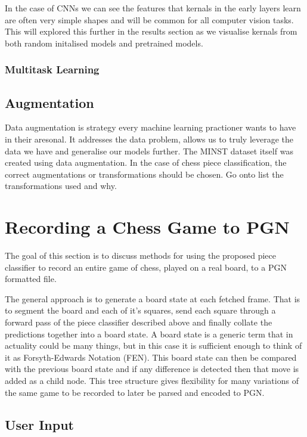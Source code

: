 In the case of CNNs we can see the features that kernals in the early layers learn \cite{} are often very simple shapes and will be common for all
computer vision tasks.  This will explored this further in the results section as we visualise kernals from both random initalised models and 
pretrained models.

\subsubsection{Multitask Learning}

\subsection{Augmentation}
Data augmentation is strategy every machine learning practioner wants to have in their aresonal.  It addresses the data problem, allows us to truly 
leverage the data we have and generalise our models further.  The MINST \cite{} dataset itself was created using data augmentation.
In the case of chess piece classification, the correct augmentations or transformations should be chosen.
Go onto list the transformations used and why.


\section{Recording a Chess Game to PGN}
The goal of this section is to discuss methods for using the proposed piece classifier to record an entire game of chess, played on a real board, 
to a PGN formatted file.

The general approach is to generate a board state at each fetched frame.  That is to segment the board and each of it's squares, send each square 
through a forward pass of the piece classifier described above and finally collate the predictions together into a board state.  A board state is 
a generic term that in actuality could be many things, but in this case it is sufficient enough to think of it as Forsyth-Edwards Notation (FEN).
This board state can then be compared with the previous board state and if any difference is detected then that move is added as a child node.
This tree structure gives flexibility for many variations of the same game to be recorded to later be parsed and encoded to PGN.

\subsection{User Input}


